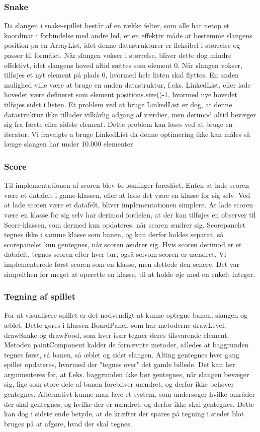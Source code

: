 \subsubsection{Snake}
Da slangen i snake-spillet består af en række felter, som alle har netop et koordinat i forbindelse med andre led, er en effektiv måde at bestemme slangens position på en ArrayList, idet denne datastrukturer er fleksibel i størrelse og passer til formålet. Når slangen vokser i størrelse, bliver dette dog mindre effektivt, idet slangens hoved altid sættes som element 0. Når slangen vokser, tilføjes et nyt element på plads 0, hvormed hele listen skal flyttes. En anden mulighed ville være at bruge en anden datastruktur, f.eks. LinkedList, eller lade hovedet være defineret som element positions.size()-1, hvormed nye hovedet tilføjes sidst i listen. Et problem ved at bruge LinkedList er dog, at denne datastruktur ikke tillader vilkårlig adgang af værdier, men derimod altid bevæger sig fra første eller sidste element. Dette problem kan løses ved at bruge en iterator. Vi fravalgte a bruge LinkedList da denne optimering ikke kan måles så længe slangen har under 10.000 elementer.

\subsubsection{Score}
Til implementationen af scoren blev to løsninger foreslået. Enten at lade scoren være et datafelt i game-klassen, eller at lade det være en klasse for sig selv. Ved at lade scoren være et datafelt, bliver implementationen simplere. At lade scoren være en klasse for sig selv har derimod fordelen, at der kan tilføjes en observer til Score-klassen, som dermed kun opdateres, når scoren ændrer sig. Scorepanelet tegnes ikke i samme klasse som banen, og kan derfor holdes separat, så scorepanelet kun gentegnes, når scoren ændrer sig. Hvis scoren derimod er et datafelt, tegnes scoren efter hver tur, også selvom scoren er uændret. Vi implementerede først scoren som en klasse, men slettede den senere. Det var simpelthen for meget at operette en klasse, til at holde øje med en enkelt integer.

\subsubsection{Tegning af spillet}
For at visualisere spillet er det nødvendigt at kunne optegne banen, slangen og æblet. Dette gøres i klassen BoardPanel, som har metoderne drawLevel, drawSnake og drawFood, som hver især tegner deres tilsvarende element. Metoden paintComponent kalder de førnævnte metoder, således at baggrunden tegnes først, så banen, så æblet og sidst slangen. Alting gentegnes hver gang spillet opdateres, hvormed der "tegnes over" det gamle billede. Det kan her argumenteres for, at f.eks. baggrunden ikke bør gentegnes, når slangen bevæger sig, lige som store dele af banen forebliver uændret, og derfor ikke behøver gentegnes. Alternativt kunne man lave et system, som undersøger hvilke områder der skal gentegnes, og hvilke der er uændret, og derfor ikke skal gentegnes. Dette kan dog i sidste ende betyde, at de kræfter der spares på tegning i stedet blot bruges på at afgøre, hvad der skal tegnes.

